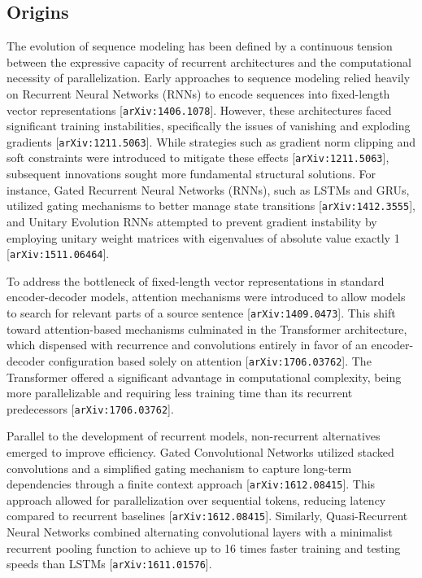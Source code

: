 \documentclass[11pt]{article}
\begin{document}
\subsection{Origins}

The evolution of sequence modeling has been defined by a continuous tension between the expressive capacity of recurrent architectures and the computational necessity of parallelization. Early approaches to sequence modeling relied heavily on Recurrent Neural Networks (RNNs) to encode sequences into fixed-length vector representations [\texttt{arXiv:1406.1078}]. However, these architectures faced significant training instabilities, specifically the issues of vanishing and exploding gradients [\texttt{arXiv:1211.5063}]. While strategies such as gradient norm clipping and soft constraints were introduced to mitigate these effects [\texttt{arXiv:1211.5063}], subsequent innovations sought more fundamental structural solutions. For instance, Gated Recurrent Neural Networks (RNNs), such as LSTMs and GRUs, utilized gating mechanisms to better manage state transitions [\texttt{arXiv:1412.3555}], and Unitary Evolution RNNs attempted to prevent gradient instability by employing unitary weight matrices with eigenvalues of absolute value exactly 1 [\texttt{arXiv:1511.06464}].

To address the bottleneck of fixed-length vector representations in standard encoder-decoder models, attention mechanisms were introduced to allow models to search for relevant parts of a source sentence [\texttt{arXiv:1409.0473}]. This shift toward attention-based mechanisms culminated in the Transformer architecture, which dispensed with recurrence and convolutions entirely in favor of an encoder-decoder configuration based solely on attention [\texttt{arXiv:1706.03762}]. The Transformer offered a significant advantage in computational complexity, being more parallelizable and requiring less training time than its recurrent predecessors [\texttt{arXiv:1706.03762}].

Parallel to the development of recurrent models, non-recurrent alternatives emerged to improve efficiency. Gated Convolutional Networks utilized stacked convolutions and a simplified gating mechanism to capture long-term dependencies through a finite context approach [\texttt{arXiv:1612.08415}]. This approach allowed for parallelization over sequential tokens, reducing latency compared to recurrent baselines [\texttt{arXiv:1612.08415}]. Similarly, Quasi-Recurrent Neural Networks combined alternating convolutional layers with a minimalist recurrent pooling function to achieve up to 16 times faster training and testing speeds than LSTMs [\texttt{arXiv:1611.01576}].
\end{document}
